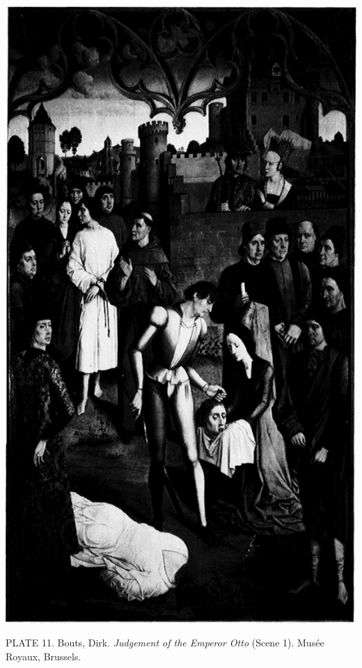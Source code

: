 \protect\hypertarget{20_ILLUSTRATIONS_FOLLOW_PAGE.xhtmlux5cux23id_11}{}{}\includegraphics{include/html/images/331_1.png}

PLATE 11. Bouts, Dirk. \emph{Judgement of the Emperor Otto} (Scene 1).
Musée Royaux, Brussels.

